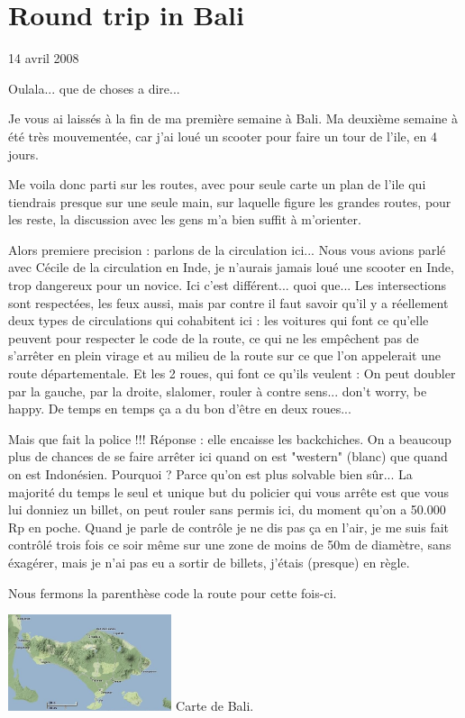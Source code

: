 \section{Round trip in Bali}

14 avril 2008

\begin{multicols}{2}

Oulala... que de choses a dire...

Je vous ai laissés à la fin de ma première semaine à Bali. Ma deuxième semaine à été très mouvementée, car j'ai loué un scooter pour faire un tour de l'ile, en 4 jours.

Me voila donc parti sur les routes, avec pour seule carte un plan de l'ile qui tiendrais presque sur une seule main, sur laquelle figure les grandes routes, pour les reste, la discussion avec les gens m'a bien suffit à m'orienter.

Alors premiere precision : parlons de la circulation ici... Nous vous avions parlé avec Cécile de la circulation en Inde, je n'aurais jamais loué une scooter en Inde, trop dangereux pour un novice. Ici c'est différent... quoi que... Les intersections sont respectées, les feux aussi, mais par contre il faut savoir qu'il y a réellement deux types de circulations qui cohabitent ici : les voitures qui font ce qu'elle peuvent pour respecter le code de la route, ce qui ne les empêchent pas de s'arrêter en plein virage et au milieu de la route sur ce que l'on appelerait une route départementale. Et les 2 roues, qui font ce qu'ils veulent : On peut doubler par la gauche, par la droite, slalomer, rouler à contre sens... don't worry, be happy. De temps en temps ça a du bon d'être en deux roues...

Mais que fait la police !!! Réponse : elle encaisse les backchiches. On a beaucoup plus de chances de se faire arrêter ici quand on est "western" (blanc) que quand on est Indonésien. Pourquoi ? Parce qu'on est plus solvable bien sûr... La majorité du temps le seul et unique but du policier qui vous arrête est que vous lui donniez un billet, on peut rouler sans permis ici, du moment qu'on a 50.000 Rp en poche. Quand je parle de contrôle je ne dis pas ça en l'air, je me suis fait contrôlé trois fois ce soir même sur une zone de moins de 50m de diamètre, sans éxagérer, mais je n'ai pas eu a sortir de billets, j'étais (presque) en règle.

Nous fermons la parenthèse code la route pour cette fois-ci.

\hspace*{-0.65cm}
\includegraphics[width=4.8cm]{articles/Round-trip-in-bali/1208257310r6gK.jpg}
Carte de Bali.



\end{multicols}
